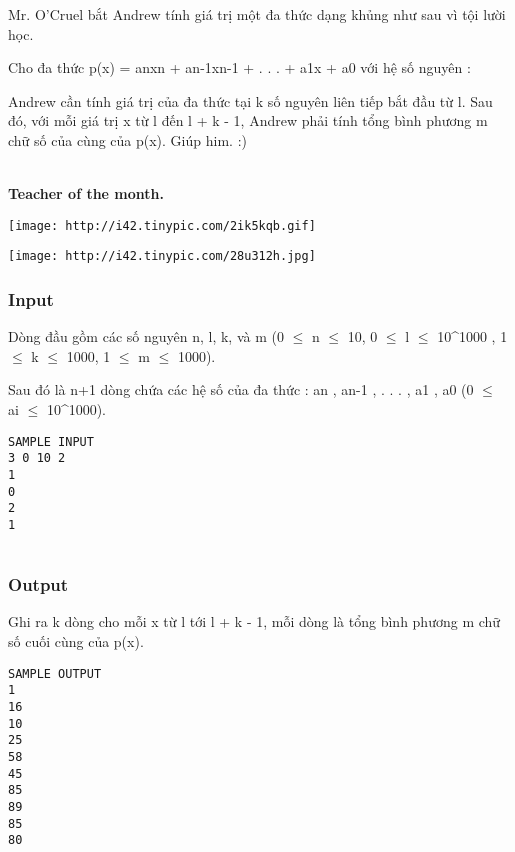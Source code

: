 

Mr. O'Cruel bắt Andrew tính giá trị một đa thức dạng khủng như sau vì tội lười học.

Cho đa thức p(x) = anxn + an-1xn-1 + . . . + a1x + a0 với hệ số nguyên :

Andrew cần tính giá trị của đa thức tại k số nguyên liên tiếp bắt đầu từ l. Sau đó, với mỗi giá trị x từ l đến l + k - 1, Andrew phải tính tổng bình phương m chữ số của cùng của p(x). Giúp him. :)


\\\textbf{Teacher of the month. }


\texttt{[image: http://i42.tinypic.com/2ik5kqb.gif]}


\texttt{[image: http://i42.tinypic.com/28u312h.jpg]}

\subsubsection{Input}

Dòng đầu gồm các số nguyên n, l, k, và m (0  $\le$  n  $\le$  10, 0  $\le$  l  $\le$  10^1000 , 1  $\le$  k  $\le$  1000, 1  $\le$  m  $\le$  1000).

Sau đó là n+1 dòng chứa các hệ số của đa thức : an , an-1 , . . . , a1 , a0 (0  $\le$  ai  $\le$  10^1000).
\begin{verbatim}
SAMPLE INPUT
3 0 10 2
1
0
2
1


\end{verbatim}

\subsubsection{Output}

Ghi ra k dòng cho mỗi x từ l tới l + k - 1, mỗi dòng là tổng bình phương m chữ số cuối cùng của p(x).
\begin{verbatim}
SAMPLE OUTPUT
1
16
10
25
58
45
85
89
85
80
\end{verbatim}

 

